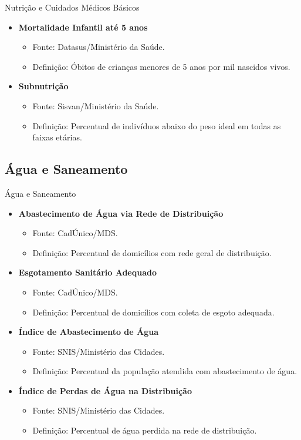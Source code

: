 \documentclass{beamer}
\begin{document}
\begin{frame}{Nutrição e Cuidados Médicos Básicos}
\begin{itemize}
    \item \textbf{Mortalidade Infantil até 5 anos}
    \begin{itemize}
        \item Fonte: Datasus/Ministério da Saúde.
        \item Definição: Óbitos de crianças menores de 5 anos por mil nascidos vivos.
    \end{itemize}
    \item \textbf{Subnutrição}
    \begin{itemize}
        \item Fonte: Sisvan/Ministério da Saúde.
        \item Definição: Percentual de indivíduos abaixo do peso ideal em todas as faixas etárias.
    \end{itemize}
\end{itemize}
\end{frame}

\subsection{Água e Saneamento}
\begin{frame}{Água e Saneamento}
\begin{itemize}
    \item \textbf{Abastecimento de Água via Rede de Distribuição}
    \begin{itemize}
        \item Fonte: CadÚnico/MDS.
        \item Definição: Percentual de domicílios com rede geral de distribuição.
    \end{itemize}
    \item \textbf{Esgotamento Sanitário Adequado}
    \begin{itemize}
        \item Fonte: CadÚnico/MDS.
        \item Definição: Percentual de domicílios com coleta de esgoto adequada.
    \end{itemize}
    \item \textbf{Índice de Abastecimento de Água}
    \begin{itemize}
        \item Fonte: SNIS/Ministério das Cidades.
        \item Definição: Percentual da população atendida com abastecimento de água.
    \end{itemize}
    \item \textbf{Índice de Perdas de Água na Distribuição}
    \begin{itemize}
        \item Fonte: SNIS/Ministério das Cidades.
        \item Definição: Percentual de água perdida na rede de distribuição.
    \end{itemize}
\end{itemize}
\end{frame}
\end{document}
